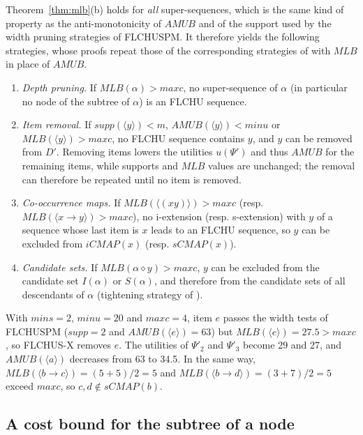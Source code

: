 \documentclass[runningheads]{llncs}
\newcommand{\FL}{\textsc{FLCHUSPM}}
\newcommand{\FX}{\textsc{FLCHUS-X}}
\newcommand{\amub}{\ensuremath{\mathit{AMUB}}}
\newcommand{\mlb}{\ensuremath{\mathit{MLB}}}
\newcommand{\supp}{\ensuremath{\mathit{supp}}}
\newcommand{\minu}{\ensuremath{\mathit{minu}}}
\newcommand{\maxc}{\ensuremath{\mathit{maxc}}}
\newcommand{\mins}{\ensuremath{\mathit{mins}}}
\newcommand{\seq}[1]{\langle #1\rangle}
\begin{document}
Theorem~\ref{thm:mlb}(b) holds for \emph{all} super-sequences, which is the same kind of
property as the anti-monotonicity of \amub{} and of the support used by the width pruning
strategies of \FL{}. It therefore yields the following strategies, whose proofs repeat those
of the corresponding strategies of \cite[Section~4.3]{truong2022} with \mlb{} in place of
\amub{}.

\begin{corollary}\label{cor:strategies}
\begin{enumerate}
\item \emph{Depth pruning.} If $\mlb(\alpha) > \maxc$, no super-sequence of $\alpha$ (in
  particular no node of the subtree of $\alpha$) is an FLCHU sequence.
\item \emph{Item removal.} If $\supp(\seq{y}) < m$, $\amub(\seq{y}) < \minu$ or
  $\mlb(\seq{y}) > \maxc$, no FLCHU sequence contains $y$, and $y$ can be removed from $D'$.
  Removing items lowers the utilities $u(\Psi')$ and thus \amub{} for the remaining items,
  while supports and \mlb{} values are unchanged; the removal can therefore be repeated until
  no item is removed.
\item \emph{Co-occurrence maps.} If $\mlb(\seq{(xy)}) > \maxc$ (resp.
  $\mlb(\seq{x \to y}) > \maxc$), no i-extension (resp. s-extension) with $y$ of a sequence
  whose last item is $x$ leads to an FLCHU sequence, so $y$ can be excluded from
  $\mathit{iCMAP}(x)$ (resp. $\mathit{sCMAP}(x)$).
\item \emph{Candidate sets.} If $\mlb(\alpha \diamond y) > \maxc$, $y$ can be excluded from
  the candidate set $I(\alpha)$ or $S(\alpha)$, and therefore from the candidate sets of all
  descendants of $\alpha$ (tightening strategy of \cite{truong2022}).
\end{enumerate}
\end{corollary}

\begin{example}
With $\mins = 2$, $\minu = 20$ and $\maxc = 4$, item $e$ passes the width tests of \FL{}
($\supp = 2$ and $\amub(\seq{e}) = 63$) but $\mlb(\seq{e}) = 27.5 > \maxc$, so \FX{} removes $e$.
The utilities of $\Psi'_2$ and $\Psi'_3$ become 29 and 27, and $\amub(\seq{a})$ decreases from
63 to 34.5. In the same way, $\mlb(\seq{b \to c}) = (5 + 5)/2 = 5$ and
$\mlb(\seq{b \to d}) = (3 + 7)/2 = 5$ exceed \maxc, so $c, d \notin \mathit{sCMAP}(b)$.
\end{example}

\subsection{A cost bound for the subtree of a node}\label{sec:mdb}
\end{document}
